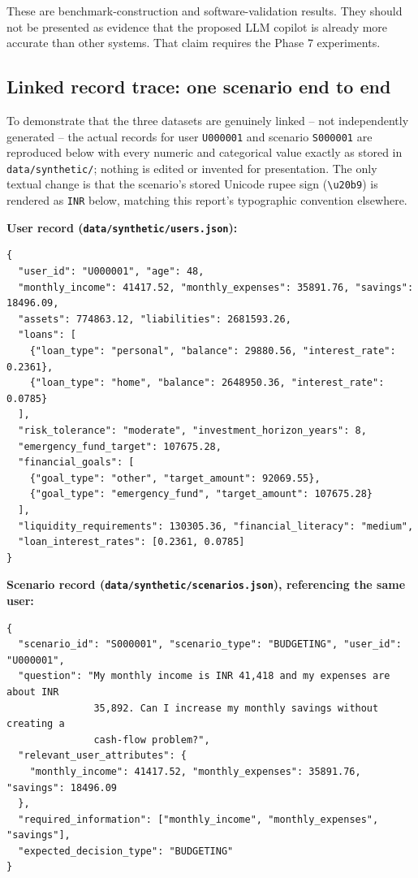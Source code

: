 \documentclass[12pt,a4paper]{article}
\begin{document}
These are benchmark-construction and software-validation results. They should not be presented as evidence that the proposed LLM copilot is already more accurate than other systems. That claim requires the Phase 7 experiments.

\subsection{Linked record trace: one scenario end to end}

To demonstrate that the three datasets are genuinely linked -- not independently generated -- the actual records for user \texttt{U000001} and scenario \texttt{S000001} are reproduced below with every numeric and categorical value exactly as stored in \texttt{data/synthetic/}; nothing is edited or invented for presentation. The only textual change is that the scenario's stored Unicode rupee sign (\texttt{\textbackslash u20b9}) is rendered as \texttt{INR} below, matching this report's typographic convention elsewhere.

\textbf{User record (\texttt{data/synthetic/users.json}):}
{\scriptsize
\begin{verbatim}
{
  "user_id": "U000001", "age": 48,
  "monthly_income": 41417.52, "monthly_expenses": 35891.76, "savings": 18496.09,
  "assets": 774863.12, "liabilities": 2681593.26,
  "loans": [
    {"loan_type": "personal", "balance": 29880.56, "interest_rate": 0.2361},
    {"loan_type": "home", "balance": 2648950.36, "interest_rate": 0.0785}
  ],
  "risk_tolerance": "moderate", "investment_horizon_years": 8,
  "emergency_fund_target": 107675.28,
  "financial_goals": [
    {"goal_type": "other", "target_amount": 92069.55},
    {"goal_type": "emergency_fund", "target_amount": 107675.28}
  ],
  "liquidity_requirements": 130305.36, "financial_literacy": "medium",
  "loan_interest_rates": [0.2361, 0.0785]
}
\end{verbatim}
}

\textbf{Scenario record (\texttt{data/synthetic/scenarios.json}), referencing the same user:}
{\scriptsize
\begin{verbatim}
{
  "scenario_id": "S000001", "scenario_type": "BUDGETING", "user_id": "U000001",
  "question": "My monthly income is INR 41,418 and my expenses are about INR
               35,892. Can I increase my monthly savings without creating a
               cash-flow problem?",
  "relevant_user_attributes": {
    "monthly_income": 41417.52, "monthly_expenses": 35891.76, "savings": 18496.09
  },
  "required_information": ["monthly_income", "monthly_expenses", "savings"],
  "expected_decision_type": "BUDGETING"
}
\end{verbatim}
}
\end{document}
